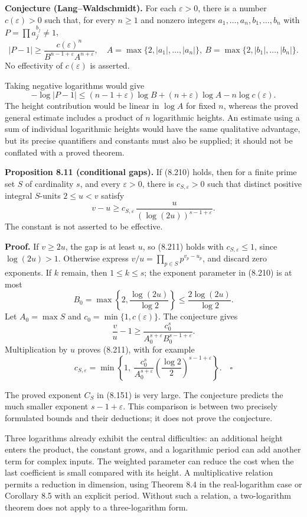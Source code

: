 \documentclass[
  11pt,
  a4paper,
]{article}
\begin{document}
\textbf{Conjecture (Lang--Waldschmidt).} For each \(\varepsilon>0\),
there is a number \(c(\varepsilon)>0\) such that, for every \(n\ge1\)
and nonzero integers \(a_1,\ldots,a_n,b_1,\ldots,b_n\) with
\(P=\prod a_j^{b_j}\ne1\), \[
|P-1|\ge
\frac{c(\varepsilon)^n}
{B^{n-1+\varepsilon}A^{n+\varepsilon}},
\quad
A=\max\{2,|a_1|,\ldots,|a_n|\},\
B=\max\{2,|b_1|,\ldots,|b_n|\}. \tag{8.210}
\] No effectivity of \(c(\varepsilon)\) is asserted.

Taking negative logarithms would give \[
-\log|P-1|\le
(n-1+\varepsilon)\log B+
(n+\varepsilon)\log A-n\log c(\varepsilon).
\] The height contribution would be linear in \(\log A\) for fixed
\(n\), whereas the proved general estimate includes a product of \(n\)
logarithmic heights. An estimate using a sum of individual logarithmic
heights would have the same qualitative advantage, but its precise
quantifiers and constants must also be supplied; it should not be
conflated with a proved theorem.

\textbf{Proposition 8.11 (conditional gaps).} If (8.210) holds, then for
a finite prime set \(S\) of cardinality \(s\), and every
\(\varepsilon>0\), there is \(c_{S,\varepsilon}>0\) such that distinct
positive integral \(S\)-units \(2\le u<v\) satisfy \[
v-u\ge
c_{S,\varepsilon}\,
\frac{u}{(\log(2u))^{s-1+\varepsilon}}. \tag{8.211}
\] The constant is not asserted to be effective.

\textbf{Proof.} If \(v\ge2u\), the gap is at least \(u\), so (8.211)
holds with \(c_{S,\varepsilon}\le1\), since \(\log(2u)>1\). Otherwise
express \(v/u=\prod_{p\in S}p^{v_p-u_p}\), and discard zero exponents.
If \(k\) remain, then \(1\le k\le s\); the exponent parameter in (8.210)
is at most \[
B_0=\max\left\{2,\frac{\log(2u)}{\log2}\right\}
\le\frac{2\log(2u)}{\log2}.
\] Let \(A_0=\max S\) and \(c_0=\min\{1,c(\varepsilon)\}\). The
conjecture gives \[
\frac vu-1\ge
\frac{c_0^s}{A_0^{s+\varepsilon}B_0^{s-1+\varepsilon}}.
\] Multiplication by \(u\) proves (8.211), with for example \[
c_{S,\varepsilon}=
\min\left\{1,\
\frac{c_0^s}{A_0^{s+\varepsilon}}
\left(\frac{\log2}{2}\right)^{s-1+\varepsilon}\right\}.
\quad\square
\]

The proved exponent \(C_S\) in (8.151) is very large. The conjecture
predicts the much smaller exponent \(s-1+\varepsilon\). This comparison
is between two precisely formulated bounds and their deductions; it does
not prove the conjecture.

Three logarithms already exhibit the central difficulties: an additional
height enters the product, the constant grows, and a logarithmic period
can add another term for complex inputs. The weighted parameter can
reduce the cost when the last coefficient is small compared with its
height. A multiplicative relation permits a reduction in dimension,
using Theorem 8.4 in the real-logarithm case or Corollary 8.5 with an
explicit period. Without such a relation, a two-logarithm theorem does
not apply to a three-logarithm form.
\end{document}
